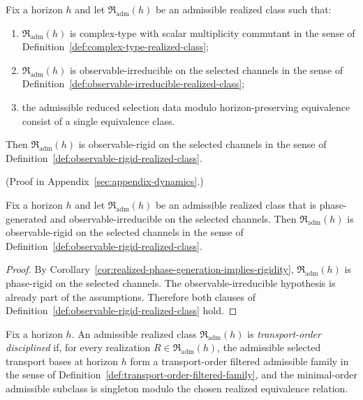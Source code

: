 \begin{corollary}
\label{cor:scalar-commutant-complex-type-implies-observable-rigid}
Fix a horizon $h$ and let $\mathfrak R_{\mathrm{adm}}(h)$ be an admissible
realized class such that:
\begin{enumerate}[label=(\roman*), leftmargin=2em, itemsep=0.2em]
\item $\mathfrak R_{\mathrm{adm}}(h)$ is complex-type with scalar multiplicity
      commutant in the sense of
      Definition~\ref{def:complex-type-realized-class};
\item $\mathfrak R_{\mathrm{adm}}(h)$ is observable-irreducible on the
      selected channels in the sense of
      Definition~\ref{def:observable-irreducible-realized-class};
\item the admissible reduced selection data modulo horizon-preserving
      equivalence consist of a single equivalence class.
\end{enumerate}
Then $\mathfrak R_{\mathrm{adm}}(h)$ is observable-rigid on the selected
channels in the sense of
Definition~\ref{def:observable-rigid-realized-class}.
\end{corollary}

(Proof in Appendix~\ref{sec:appendix-dynamics}.)

\begin{corollary}
\label{cor:generated-observable-implies-rigid}
Fix a horizon $h$ and let $\mathfrak R_{\mathrm{adm}}(h)$ be an admissible
realized class that is phase-generated and observable-irreducible on the
selected channels. Then $\mathfrak R_{\mathrm{adm}}(h)$ is observable-rigid on
the selected channels in the sense of
Definition~\ref{def:observable-rigid-realized-class}.
\end{corollary}

\begin{proof}
By Corollary~\ref{cor:realized-phase-generation-implies-rigidity},
$\mathfrak R_{\mathrm{adm}}(h)$ is phase-rigid on the selected channels. The
observable-irreducible hypothesis is already part of the assumptions.
Therefore both clauses of
Definition~\ref{def:observable-rigid-realized-class} hold.
\end{proof}

\begin{definition}
\label{def:transport-order-disciplined-realized-class}
Fix a horizon $h$. An admissible realized class
$\mathfrak R_{\mathrm{adm}}(h)$ is \emph{transport-order disciplined} if, for
every realization $R\in\mathfrak R_{\mathrm{adm}}(h)$, the admissible selected
transport bases at horizon $h$ form a transport-order filtered admissible
family in the sense of Definition~\ref{def:transport-order-filtered-family},
and the minimal-order admissible subclass is singleton modulo the chosen
realized equivalence relation.
\end{definition}


